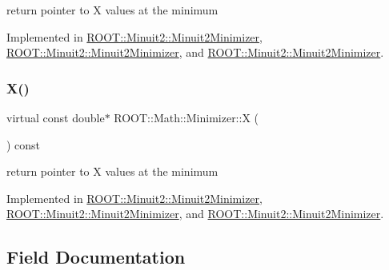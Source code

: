 return pointer to X values at the minimum 



Implemented in \mbox{\hyperlink{classROOT_1_1Minuit2_1_1Minuit2Minimizer_ac9372eb08937cf14acb8862ba3166c26}{R\+O\+O\+T\+::\+Minuit2\+::\+Minuit2\+Minimizer}}, \mbox{\hyperlink{classROOT_1_1Minuit2_1_1Minuit2Minimizer_ac9372eb08937cf14acb8862ba3166c26}{R\+O\+O\+T\+::\+Minuit2\+::\+Minuit2\+Minimizer}}, and \mbox{\hyperlink{classROOT_1_1Minuit2_1_1Minuit2Minimizer_ac9372eb08937cf14acb8862ba3166c26}{R\+O\+O\+T\+::\+Minuit2\+::\+Minuit2\+Minimizer}}.

\mbox{\label{classROOT_1_1Math_1_1Minimizer_a35c7c2caf54e548f892d84795209edad}} 
\subsubsection{\texorpdfstring{X()}{X()}\hspace{0.1cm}{\footnotesize\ttfamily [3/3]}}
{\footnotesize\ttfamily virtual const double$\ast$ R\+O\+O\+T\+::\+Math\+::\+Minimizer\+::X (\begin{DoxyParamCaption}{ }\end{DoxyParamCaption}) const\hspace{0.3cm}{\ttfamily [pure virtual]}}



return pointer to X values at the minimum 



Implemented in \mbox{\hyperlink{classROOT_1_1Minuit2_1_1Minuit2Minimizer_ac9372eb08937cf14acb8862ba3166c26}{R\+O\+O\+T\+::\+Minuit2\+::\+Minuit2\+Minimizer}}, \mbox{\hyperlink{classROOT_1_1Minuit2_1_1Minuit2Minimizer_ac9372eb08937cf14acb8862ba3166c26}{R\+O\+O\+T\+::\+Minuit2\+::\+Minuit2\+Minimizer}}, and \mbox{\hyperlink{classROOT_1_1Minuit2_1_1Minuit2Minimizer_ac9372eb08937cf14acb8862ba3166c26}{R\+O\+O\+T\+::\+Minuit2\+::\+Minuit2\+Minimizer}}.



\subsection{Field Documentation}
\mbox{\label{classROOT_1_1Math_1_1Minimizer_a76f49eba837f9697e9eece2060c6242a}} 
